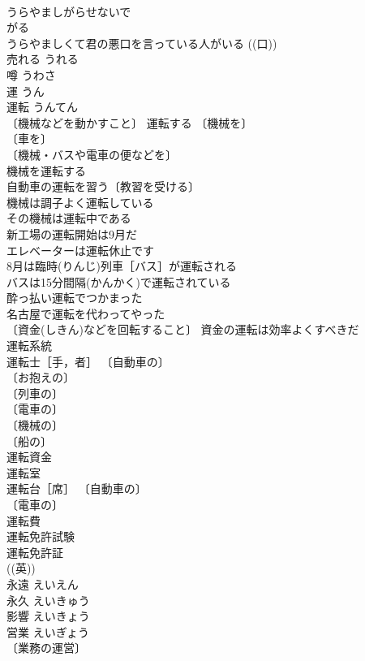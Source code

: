 \documentclass[8pt]{extreport}
\begin{document}
\begin{CJK}{UTF8}{min}
\\	うらやましがらせないで 
\\	がる　
\\	うらやましくて君の悪口を言っている人がいる ((口)) 
\\	売れる	うれる	
\\	噂	うわさ	
\\	運	うん	
\\	運転	うんてん	
\\	〔機械などを動かすこと〕 運転する 〔機械を〕
\\	〔車を〕
\\	〔機械・バスや電車の便などを〕
\\	機械を運転する 
\\	自動車の運転を習う〔教習を受ける〕 
\\	機械は調子よく運転している 
\\	その機械は運転中である 
\\	新工場の運転開始は9月だ 
\\	エレベーターは運転休止です 
\\	8月は臨時(りんじ)列車［バス］が運転される 
\\	バスは15分間隔(かんかく)で運転されている 
\\	酔っ払い運転でつかまった 
\\	名古屋で運転を代わってやった 
\\	〔資金(しきん)などを回転すること〕 資金の運転は効率よくすべきだ 
\\	運転系統 
\\	運転士［手，者］ 〔自動車の〕
\\	〔お抱えの〕
\\	〔列車の〕
\\	〔電車の〕
\\	〔機械の〕
\\	〔船の〕
\\	運転資金 
\\	運転室 
\\	運転台［席］ 〔自動車の〕
\\	〔電車の〕
\\	運転費 
\\	運転免許試験 
\\	運転免許証 
\\	((英)) 
\\	永遠	えいえん	
\\	永久	えいきゅう	
\\	影響	えいきょう	
\\	営業	えいぎょう	
\\	〔業務の運営〕

\end{CJK}
\end{document}
